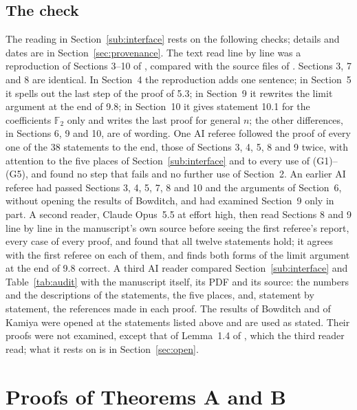\documentclass[11pt,a4paper]{article}
\theoremstyle{definition}
\theoremstyle{remark}
\newcommand{\F}{\mathbb{F}}
\begin{document}
\subsection{The check}\label{sub:check}
The reading in Section~\ref{sub:interface} rests on the following checks;
details and dates are in Section~\ref{sec:provenance}. The text read line by
line was a reproduction of Sections 3--10 of \cite{O}, compared with the source
files of \cite{O}. Sections 3, 7 and 8 are identical. In Section~4 the
reproduction adds one sentence; in Section~5 it spells out the last step of the
proof of 5.3; in Section~9 it rewrites the limit argument at the end of 9.8; in
Section~10 it gives statement 10.1 for the coefficients $\F_2$ only and writes
the last proof for general $n$; the other differences, in Sections 6, 9 and 10,
are of wording. One AI referee followed the proof of
every one of the 38 statements to the end, those of Sections 3, 4, 5, 8 and 9
twice, with attention to the five places of Section~\ref{sub:interface} and to
every use of (G1)--(G5), and found no step that fails and no further use of
Section~2. An earlier AI referee had passed Sections 3, 4, 5, 7, 8 and 10
and the arguments of Section~6, without opening the results of Bowditch, and had
examined Section~9 only in part. A second reader, Claude Opus~5.5 at effort
high, then read Sections 8 and 9 line by line in the manuscript's own source
before seeing the first referee's report, every case of every proof, and found
that all twelve statements hold; it agrees with the first referee on each of
them, and finds both forms of the limit argument at the end of 9.8 correct. A third AI reader compared
Section~\ref{sub:interface} and Table~\ref{tab:audit} with the manuscript
itself, its PDF and its source: the numbers and the descriptions of the
statements, the five places, and, statement by statement, the references made
in each proof. The results of Bowditch and of Kamiya were opened at the
statements listed above and are used as stated. Their proofs were not examined,
except that of Lemma~1.4 of \cite{BoC}, which the third reader read; what it
rests on is in Section~\ref{sec:open}.

\section{Proofs of Theorems A and B}
\end{document}
